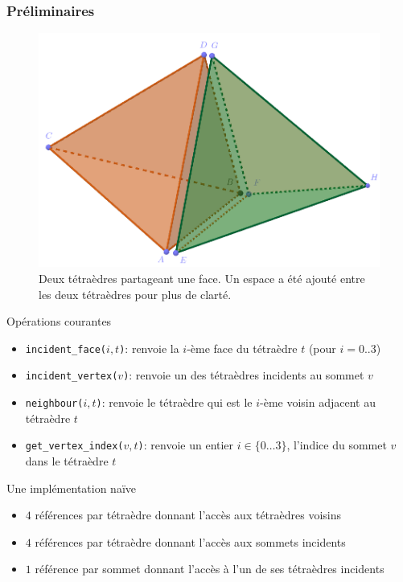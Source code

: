 \documentclass[9pt]{beamer}
\begin{document}
\begin{frame}
\footnotesize
\frametitle{Préliminaires}
\begin{figure}
\includegraphics[scale=0.12]{Images/naive}
\caption{Deux tétraèdres partageant une face. Un espace a été ajouté entre les deux tétraèdres pour plus de clarté.}
\end{figure}
\begin{block}{Opérations courantes}
\begin{itemize}
\item \texttt{incident\_face($i,t$)}: renvoie la $i$-ème face du tétraèdre $t$ (pour $i=0..3$)
\item \texttt{incident\_vertex($v$)}: renvoie un des tétraèdres incidents au sommet $v$
\item \texttt{neighbour($i, t$)}: renvoie le tétraèdre qui est le $i$-ème voisin adjacent au tétraèdre $t$
\item \texttt{get\_vertex\_index($v,t$)}: renvoie un entier $i\in\{0 \ldots 3 \}$, l'indice du sommet $v$ dans le tétraèdre $t$
\end{itemize}
\end{block}

\begin{block}{Une implémentation naïve}
\begin{itemize}
\item $4$ références par tétraèdre donnant l'accès aux tétraèdres voisins
\item $4$ références par tétraèdre donnant l'accès aux sommets incidents
\item $1$ référence par sommet donnant l'accès à l'un de ses tétraèdres incidents
\end{itemize}
\end{block}
\end{frame}
\end{document}
